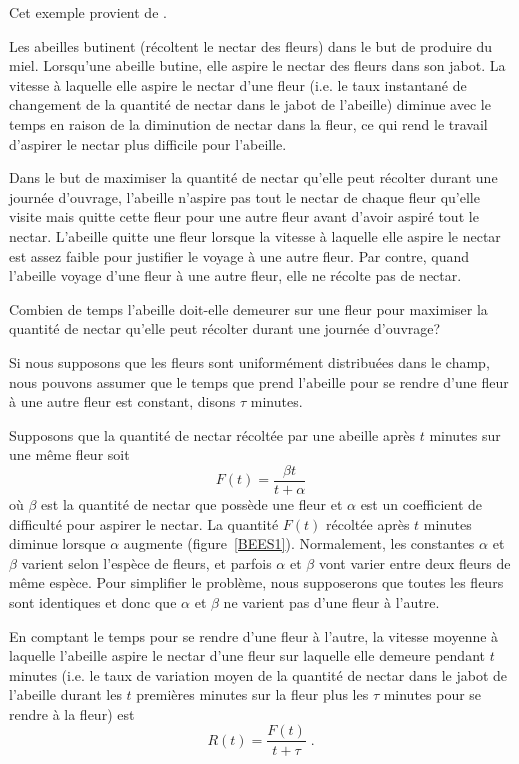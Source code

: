 {\begin{egg}[\life]
Cet exemple provient de \cite{A}.

Les abeilles butinent (récoltent le nectar des fleurs) dans le but de
produire du miel.  Lorsqu'une abeille butine, elle aspire le nectar
des fleurs dans son jabot.  La vitesse à laquelle elle aspire le
nectar d'une fleur (i.e. le taux instantané de changement de la
quantité de nectar dans le jabot de l'abeille) diminue avec le temps
en raison de la diminution de nectar dans la fleur, ce qui rend le
travail d'aspirer le nectar plus difficile pour l'abeille.

Dans le but de maximiser la quantité de nectar qu'elle peut récolter
durant une journée d'ouvrage, l'abeille n'aspire pas tout le nectar de
chaque fleur qu'elle visite mais quitte cette fleur pour une autre
fleur avant d'avoir aspiré tout le nectar.  L'abeille quitte une fleur
lorsque la vitesse à laquelle elle aspire le nectar est assez faible
pour justifier le voyage à une autre fleur.  Par contre, quand
l'abeille voyage d'une fleur à une autre fleur, elle ne récolte pas de
nectar.

Combien de temps l'abeille doit-elle demeurer sur une fleur pour
maximiser la quantité de nectar qu'elle peut récolter durant une
journée d'ouvrage?

Si nous supposons que les fleurs sont uniformément distribuées dans le
champ, nous pouvons assumer que le temps que prend l'abeille pour se rendre
d'une fleur à une autre fleur est constant, disons $\tau$ minutes.

Supposons que la quantité de nectar récoltée par une abeille après $t$
minutes sur une même fleur soit
\[
F(t) = \frac{\beta t}{t+\alpha}
\]
où $\beta$ est la quantité de nectar que possède une fleur et $\alpha$
est un coefficient de difficulté pour aspirer le nectar.  La quantité
$F(t)$ récoltée après $t$ minutes diminue lorsque $\alpha$ augmente
(figure~\ref{BEES1}).  Normalement, les constantes $\alpha$ et
$\beta$ varient selon l'espèce de fleurs, et parfois $\alpha$ et
$\beta$ vont varier entre deux fleurs de même espèce.  Pour simplifier
le problème, nous supposerons que toutes les fleurs sont identiques et
donc que $\alpha$ et $\beta$ ne varient pas d'une fleur à l'autre.


En comptant le temps pour se rendre d'une fleur à l'autre, la vitesse
moyenne à laquelle l'abeille aspire le nectar d'une fleur sur laquelle
elle demeure pendant $t$ minutes (i.e. le taux de variation moyen de la
quantité de nectar dans le jabot de l'abeille durant les $t$ premières
minutes sur la fleur plus les $\tau$ minutes pour se rendre à la
fleur) est
\[
R(t) = \frac{F(t)}{t+\tau} \; .
\]


\end{egg}}
